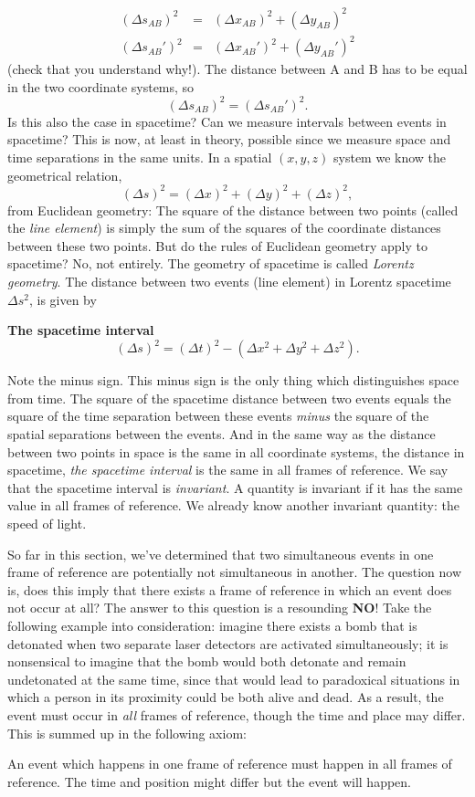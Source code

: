 {\begin{multicols}{2}
\begin{eqnarray*}
(\Delta s_{AB})^2&=&(\Delta x_{AB})^2+(\Delta y_{AB})^2\\
(\Delta s_{AB}')^2&=&(\Delta x_{AB}')^2+(\Delta y_{AB}')^2
\end{eqnarray*}
(check that you understand why!). The distance between A and B has to be equal in the two coordinate systems, so
\[
(\Delta s_{AB})^2=(\Delta s_{AB}')^2.
\]
Is this also the case in spacetime? Can we measure intervals between events in spacetime? This is now, at least in theory, possible since we measure space and time separations in the same units. In a spatial $(x,y,z)$ system we know the geometrical relation,
\[
(\Delta s)^2=(\Delta x)^2+(\Delta y)^2+(\Delta z)^2,
\]
from Euclidean geometry: The square of the distance between two points (called the {\it line element\label{pg:lineelement}}) is simply the sum of the squares of the coordinate distances between these two points. But do the rules of Euclidean geometry apply to spacetime? No, not entirely. The geometry of spacetime is called {\it Lorentz geometry\label{pg:lorentz}}. The distance between two events (line element) in Lorentz spacetime $\Delta s^2$, is given by
\begin{formbox}
\textbf{The spacetime interval}
\[
(\Delta s)^2=(\Delta t)^2-(\Delta x^2+\Delta y^2+\Delta z^2).
\]
\end{formbox}
Note the minus sign. This minus sign is the only thing which distinguishes space from time. The square of the spacetime distance between two events equals the square of the time separation between these events \emph{minus} the square of the spatial separations between the events. And in the same way as the distance between two points in space is the same in all coordinate systems, the distance in spacetime, {\it the spacetime interval\label{pg:spacetimeinterval}} is the same in all frames of reference. We say that the spacetime interval is {\it invariant\label{pg:invariant}}. A quantity is invariant if it has the same value in all frames of reference. We already know another invariant quantity: the speed of light.

So far in this section, we've determined that two simultaneous events in one frame of reference are potentially not simultaneous in another.  The question now is, does this imply that there exists a frame of reference in which an event does not occur at all? The answer to this question is a resounding \textbf{NO}!  Take the following example into consideration: imagine there exists a bomb that is detonated when two separate laser detectors are activated simultaneously; it is nonsensical to imagine that the bomb would both detonate and remain undetonated at the same time, since that would lead to paradoxical situations in which a person in its proximity could be both alive and dead.  As a result, the event must occur in \textit{all} frames of reference, though the time and place may differ.  This is summed up in the following axiom:
\begin{formbox}
An event which happens in one frame of reference must happen in all frames of reference. The time and position might differ but the event will happen.
\end{formbox}


\end{multicols}}
